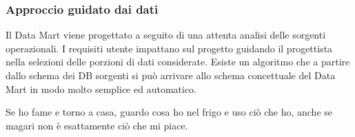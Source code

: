 \subsubsection{Approccio guidato dai dati}
Il Data Mart viene progettato a seguito di una attenta analisi delle sorgenti operazionali. I requisiti utente impattano sul progetto guidando il progettista nella selezioni delle porzioni di dati considerate.\newline
Esiste un algoritmo che a partire dallo schema dei DB sorgenti si può arrivare allo schema concettuale del Data Mart in modo molto semplice ed automatico.
\begin{info}
	Se ho fame e torno a casa, guardo cosa ho nel frigo e uso ciò che ho, anche se magari non è esattamente ciò che mi piace.
\end{info}


